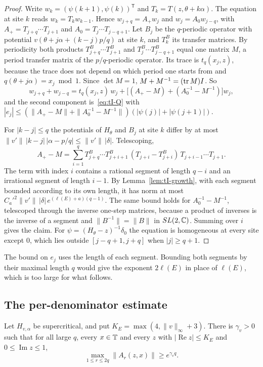 \begin{proof}
Write $w_k=(\psi(k+1),\psi(k))^{\mathsf T}$ and $T_k=T(z,\theta+k\alpha)$. The equation at site $k$ reads $w_k=T_kw_{k-1}$. Hence $w_{j+q}=A_+w_j$ and $w_j=A_0w_{j-q}$, with $A_+=T_{j+q}\cdots T_{j+1}$ and $A_0=T_j\cdots T_{j-q+1}$. Let $B_j$ be the $q$-periodic operator with potential $v(\theta+j\alpha+(k-j)p/q)$ at site $k$, and $T^B_k$ its transfer matrices. By periodicity both products $T^B_{j+q}\cdots T^B_{j+1}$ and $T^B_j\cdots T^B_{j-q+1}$ equal one matrix $M$, a period transfer matrix of the $p/q$-periodic operator. Its trace is $t_q(x_j,z)$, because the trace does not depend on which period one starts from and $q(\theta+j\alpha)=x_j\bmod1$. Since $\det M=1$, $M+M^{-1}=(\operatorname{tr} M)I$. So
\[
w_{j+q}+w_{j-q}=t_q(x_j,z)\,w_j+\bigl[(A_+-M)+(A_0^{-1}-M^{-1})\bigr]w_j,
\]
and the second component is~\eqref{eq:tI-Q} with $|e_j|\le(\|A_+-M\|+\|A_0^{-1}-M^{-1}\|)(|\psi(j)|+|\psi(j+1)|)$.

For $|k-j|\le q$ the potentials of $H_\theta$ and $B_j$ at site $k$ differ by at most $\|v'\|\,|k-j|\,|\alpha-p/q|\le\|v'\|\,|\delta|$. Telescoping,
\[
A_+-M=\sum_{i=1}^{q}T^B_{j+q}\cdots T^B_{j+i+1}\,(T_{j+i}-T^B_{j+i})\,T_{j+i-1}\cdots T_{j+1}.
\]
The term with index $i$ contains a rational segment of length $q-i$ and an irrational segment of length $i-1$. By Lemma~\ref{lem:tI-growth}, with each segment bounded according to its own length, it has norm at most $C_a'^2\|v'\|\,|\delta|\,e^{(\ell(E)+a)(q-1)}$. The same bound holds for $A_0^{-1}-M^{-1}$, telescoped through the inverse one-step matrices, because a product of inverses is the inverse of a segment and $\|B^{-1}\|=\|B\|$ in $SL(2,\mathbb C)$. Summing over $i$ gives the claim. For $\psi=(H_\theta-z)^{-1}\delta_0$ the equation is homogeneous at every site except $0$, which lies outside $[j-q+1,j+q]$ when $|j|\ge q+1$.
\end{proof}

The bound on $e_j$ uses the length of each segment. Bounding both segments by their maximal length $q$ would give the exponent $2\ell(E)$ in place of $\ell(E)$, which is too large for what follows.

\subsection{The per-denominator estimate}\label{sec:tI-M1}

\begin{lemma}\label{lem:tI-herman}
Let $H_{v,\alpha}$ be supercritical, and put $K_E=\max(4,\|v\|_\infty+3)$. There is $\gamma_v>0$ such that for all large $q$, every $x\in\mathbb T$ and every $z$ with $|\operatorname{Re}z|\le K_E$ and $0\le\operatorname{Im}z\le1$,
\[
\max_{1\le r\le2q}\|A_r(z,x)\|\ge e^{\gamma_vq}.
\]
\end{lemma}

